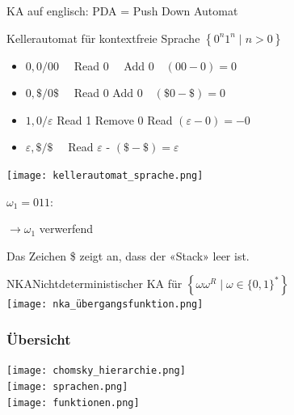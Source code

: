 \begin{remark}
    KA auf englisch: PDA = Push Down Automat
\end{remark}

\begin{KR}{Kellerautomat für kontextfreie Sprache} $\left\{0^{n} 1^{n} \mid n>0\right\}$
    \begin{itemize}
    \item $0,0 / 00 \quad$ Read $0 \quad$ Add $0 \quad(00-0)=0$
    \item $0, \$ / 0 \$ \quad$ Read 0 Add $0 \quad(\$ 0-\$)=0$
    \item $1,0 / \varepsilon$ Read 1 Remove 0 Read $(\varepsilon-0)=-0$
    \item $\varepsilon, \$ / \$ \quad$ Read $\varepsilon$ - $(\$-\$)=\varepsilon$
    \end{itemize}

    \begin{minipage}{0.5\linewidth}
        \texttt{[image: kellerautomat\_sprache.png]}
    \end{minipage}
    \begin{minipage}{0.5\linewidth}
        $\omega_{1}=011:$

        $\rightarrow \omega_{1}$ verwerfend 
        
        Das Zeichen \$ zeigt an, dass der «Stack» leer ist.
    \end{minipage}
\end{KR}

\begin{concept}{NKA}Nichtdeterministischer KA für $\left\{\omega \omega^{R} \mid \omega \in\{0,1\}^{*}\right\}$\\
    
    \texttt{[image: nka\_übergangsfunktion.png]}
\end{concept}

\subsubsection*{Übersicht}
\texttt{[image: chomsky\_hierarchie.png]}\\
\texttt{[image: sprachen.png]}\\
\texttt{[image: funktionen.png]}